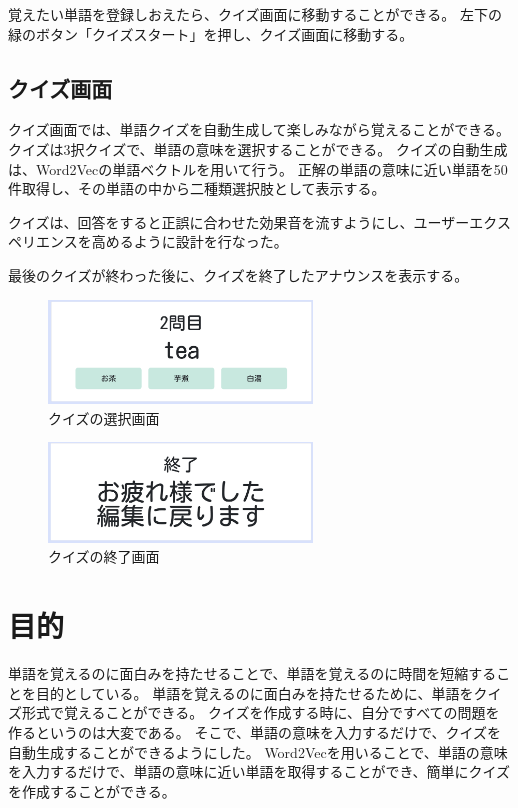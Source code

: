 \documentclass[11pt,a4paper]{jsarticle}
\begin{document}
覚えたい単語を登録しおえたら、クイズ画面に移動することができる。
左下の緑のボタン「クイズスタート」を押し、クイズ画面に移動する。

\subsection{クイズ画面}
クイズ画面では、単語クイズを自動生成して楽しみながら覚えることができる。
クイズは3択クイズで、単語の意味を選択することができる。
クイズの自動生成は、Word2Vecの単語ベクトルを用いて行う。
正解の単語の意味に近い単語を50件取得し、その単語の中から二種類選択肢として表示する。

クイズは、回答をすると正誤に合わせた効果音を流すようにし、ユーザーエクスペリエンスを高めるように設計を行なった。

最後のクイズが終わった後に、クイズを終了したアナウンスを表示する。


\begin{figure}[htbp]
    \begin{center}
        \includegraphics[width=70mm]{./img/question.png}
    \end{center}
    \caption{クイズの選択画面}
\end{figure}


\begin{figure}[htbp]
    \begin{center}
        \includegraphics[width=70mm]{./img/question_end.png}
    \end{center}
    \caption{クイズの終了画面}
\end{figure}



\section{目的}

単語を覚えるのに面白みを持たせることで、単語を覚えるのに時間を短縮することを目的としている。
単語を覚えるのに面白みを持たせるために、単語をクイズ形式で覚えることができる。
クイズを作成する時に、自分ですべての問題を作るというのは大変である。
そこで、単語の意味を入力するだけで、クイズを自動生成することができるようにした。
Word2Vecを用いることで、単語の意味を入力するだけで、単語の意味に近い単語を取得することができ、簡単にクイズを作成することができる。
\end{document}
